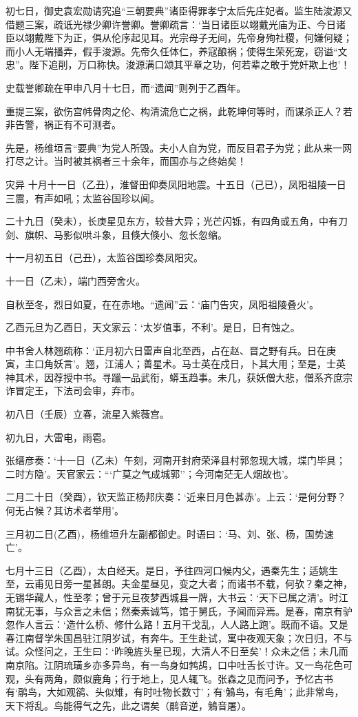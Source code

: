 \documentclass[]{article}
\begin{document}
初七日，御史袁宏勋请究追``三朝要典''诸臣得罪孝宁太后先庄妃者。监生陆浚源又借题三案，疏诋光禄少卿许誉卿。誉卿疏言：`当日诸臣以翊戴光庙为正、今日诸臣以翊戴陛下为正，俱从伦序起见耳。光宗母子无间，先帝身殉社稷，何嫌何疑；而小人无端播弄，假手浚源。先帝久任体仁，养寇酿祸；使得生荣死宠，窃谥``文忠''。陛下追削，万口称快。浚源满口颂其平章之功，何若辈之敢于党奸欺上也'！

史载誉卿疏在甲申八月十七日，而``遗闻''则列于乙酉年。

重提三案，欲伤宫帏骨肉之伦、构清流危亡之祸，此乾坤何等时，而谋杀正人？若非告警，祸正有不可测者。

先是，杨维垣言``要典''为党人所毁。夫小人自为党，而反目君子为党；此从来一网打尽之计。当时被其祸者三十余年，而国亦与之终始矣！

灾异
十月十一日（乙丑），淮督田仰奏凤阳地震。十五日（己已），凤阳祖陵一日三震，有声如吼；太监谷国珍以闻。

二十九日（癸未），长庚星见东方，较昔大异；光芒闪铄，有四角或五角，中有刀剑、旗帜、马影似哄斗象，且倏大倏小、忽长忽缩。

十一月初五日（己丑），太监谷国珍奏凤阳灾。

十一日（乙未），端门西旁舍火。

自秋至冬，烈日如夏，在在赤地。``遗闻''云：`庙门告灾，凤阳祖陵叠火'。

乙酉元旦为乙酉日，天文家云：`太岁值事，不利'。是日，日有蚀之。

中书舍人林翘疏称：`正月初六日雷声自北至西，占在赵、晋之野有兵。日在庚寅，主口角妖言'。翘，江浦人；善星术。马士英在戍日，卜其大用；至是，士英神其术，因荐授中书。寻躐一品武衔，蟒玉趋事。未几，获妖僧大悲，僧系齐庶宗诈冒定王，下法司会审，弃市。

初八日（壬辰）立春，流星入紫薇宫。

初九日，大雷电，雨雹。

张缙彦奏：`十一日（乙未）午刻，河南开封府荣泽县村郭忽现大城，堞门毕具；二时方隐'。天官家云：```广莫之气成城郭''；今河南茫无人烟故也'。

二月二十日（癸酉），钦天监正杨邦庆奏：`近来日月色甚赤'。上云：`是何分野？何无占候？其访术者举用'。

三月初二日(乙酉)，杨维垣升左副都御史。时语曰：`马、刘、张、杨，国势速亡'。

七月十三日（乙酉），太白经天。是日，予往四河口候内父，遇秦先生；适姚生至，云甫见日旁一星甚朗。夫金星昼见，变之大者；而诸书不载，何欤？秦之神，无锡华藏人，性至孝；曾于元旦夜梦西城县一牌，大书云：`天下已属之清'。时江南犹无事，与众言之未信；然秦素诚笃，馆于舅氏，予闻而异焉。是春，南京有驴忽作人言云：`造什么桥、修什么路！五月干戈乱，人人路上跑'。既而不语。又是春江南督学朱国昌驻江阴岁试，有奔牛。王生赴试，寓中夜观天象；次日归，不与试。众怪问之，王生曰：`昨晚旌头星已现，大清人不日至矣'！众未之信；未几而南京陷。江阴琉璜乡亦多异鸟，有一鸟身如鹁鸪，口中吐舌长寸许。又一鸟花色可观，头有两角，颇似鹿角；行于地上，见人辄飞。张森之见而问予，予忆古书有`鹝鸟，大如观鹆、头似雉，有时吐物长数寸'；有`鵵鸟，有毛角'；此非常鸟，天下将乱。鸟能得气之先，此之谓矣（鹝音逆，鵵音屠）。
\end{document}
